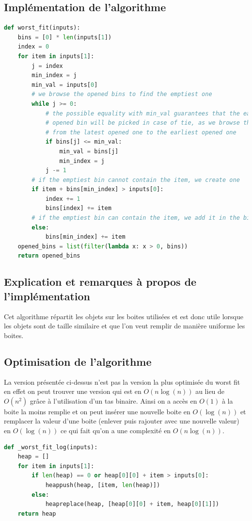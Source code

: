 \documentclass{article}
\begin{document}
\subsection{Implémentation de l'algorithme}
\begin{lstlisting}[language=Python, frame=single]
def worst_fit(inputs):
    bins = [0] * len(inputs[1])
    index = 0
    for item in inputs[1]:
        j = index
        min_index = j
        min_val = inputs[0]
        # we browse the opened bins to find the emptiest one
        while j >= 0:
            # the possible equality with min_val guarantees that the earliest
            # opened bin will be picked in case of tie, as we browse the bins
            # from the latest opened one to the earliest opened one
            if bins[j] <= min_val:
                min_val = bins[j]
                min_index = j
            j -= 1
        # if the emptiest bin cannot contain the item, we create one
        if item + bins[min_index] > inputs[0]:
            index += 1
            bins[index] += item
        # if the emptiest bin can contain the item, we add it in the bin
        else:
            bins[min_index] += item
    opened_bins = list(filter(lambda x: x > 0, bins))
    return opened_bins
\end{lstlisting}

\subsection{Explication et remarques à propos de l'implémentation}
Cet algorithme répartit les objets sur les boites utilisées et est donc utile lorsque les objets sont
de taille similaire et que l'on veut remplir de manière uniforme les boites.
\subsection{Optimisation de l'algorithme}
La version présentée ci-dessus n'est pas la version la plus optimisée du worst fit
en effet on peut trouver une version qui est en $O(n\log(n))$ au lieu de $O(n^2)$ grâce à l'utilisation
d'un tas binaire.
Ainsi on a accès en $O(1)$ à la boite la moins remplie et on peut insérer une nouvelle boite en $O(\log(n))$
et remplacer la valeur d'une boite (enlever puis rajouter avec une nouvelle valeur) en $O(\log(n))$
ce qui fait qu'on a une complexité en $O(n\log(n))$.
\begin{lstlisting}[language=Python, frame=single]
def _worst_fit_log(inputs):
    heap = []
    for item in inputs[1]:
        if len(heap) == 0 or heap[0][0] + item > inputs[0]:
            heappush(heap, [item, len(heap)])
        else:
            heapreplace(heap, [heap[0][0] + item, heap[0][1]])
    return heap
\end{lstlisting}
\end{document}
